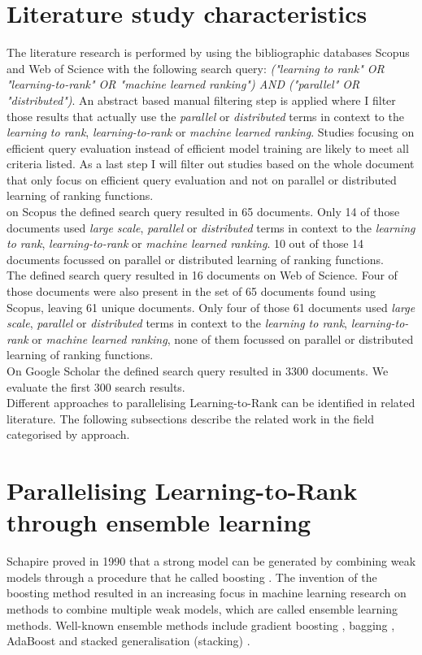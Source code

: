 \section{Literature study characteristics}
The literature research is performed by using the bibliographic databases Scopus and Web of Science with the following search query: \emph{("learning to rank" OR "learning-to-rank" OR "machine learned ranking") AND ("parallel" OR "distributed")}. An abstract based manual filtering step is applied where I filter those results that actually use the \emph{parallel} or \emph{distributed} terms in context to the \emph{learning to rank}, \emph{learning-to-rank} or \emph{machine learned ranking}. Studies focusing on efficient query evaluation instead of efficient model training are likely to meet all criteria listed. As a last step I will filter out studies based on the whole document that only focus on efficient query evaluation and not on parallel or distributed learning of ranking functions.\\

on Scopus the defined search query resulted in 65 documents. Only 14 of those documents used \emph{large scale}, \emph{parallel} or \emph{distributed} terms in context to the \emph{learning to rank}, \emph{learning-to-rank} or \emph{machine learned ranking}. 10 out of those 14 documents focussed on parallel or distributed learning of ranking functions.\\

The defined search query resulted in 16 documents on Web of Science. Four of those documents were also present in the set of 65 documents found using Scopus, leaving 61 unique documents. Only four of those 61 documents used \emph{large scale}, \emph{parallel} or \emph{distributed} terms in context to the \emph{learning to rank}, \emph{learning-to-rank} or \emph{machine learned ranking}, none of them focussed on parallel or distributed learning of ranking functions.\\

On Google Scholar the defined search query resulted in 3300 documents. We evaluate the first 300 search results.\\

Different approaches to parallelising Learning-to-Rank can be identified in related literature. The following subsections describe the related work in the field categorised by approach.

\section{Parallelising Learning-to-Rank through ensemble learning}
Schapire proved in 1990 that a strong model can be generated by combining weak models through a procedure that he called boosting \cite{Schapire1990}. The invention of the boosting method resulted in an increasing focus in machine learning research on methods to combine multiple weak models, which are called ensemble learning methods. Well-known ensemble methods include gradient boosting \cite{Friedman2001}, bagging \cite{Breiman1996}, AdaBoost \cite{Freund1997} and stacked generalisation (stacking) \cite{Wolpert1992}.\\

